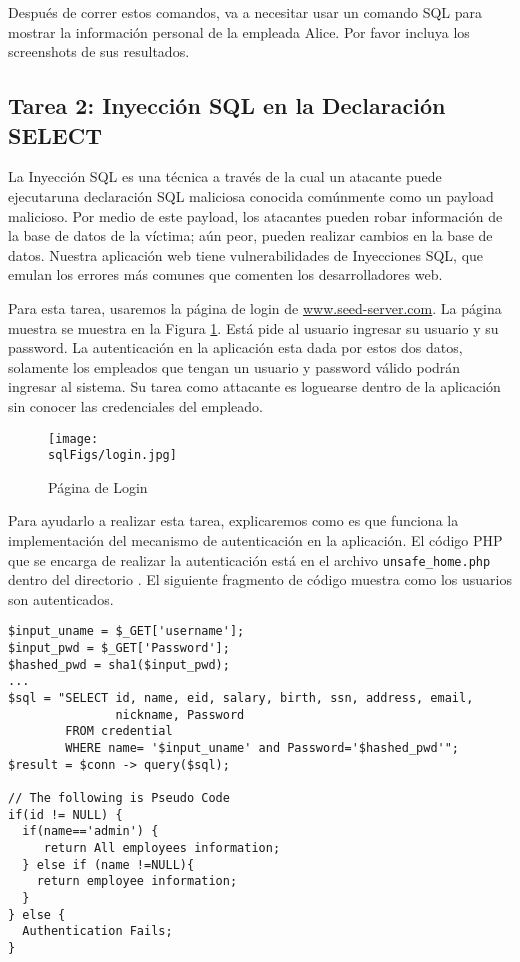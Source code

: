 Después de correr estos comandos, va a necesitar usar un comando SQL para mostrar la información personal de la empleada Alice. Por favor incluya los screenshots de sus resultados.

\subsection{Tarea 2: Inyección SQL en la Declaración SELECT} 

La Inyección SQL es una técnica a través de la cual un atacante puede ejecutaruna  declaración SQL maliciosa conocida comúnmente como un payload malicioso. Por medio de este payload, los atacantes pueden robar información de la base de datos de la víctima; aún peor, pueden realizar cambios en la base de datos. Nuestra aplicación web tiene vulnerabilidades de Inyecciones SQL, que emulan los errores más comunes que comenten los desarrolladores web.

Para esta tarea, usaremos la página de login de \url{www.seed-server.com}.
La página muestra se muestra en la Figura \ref{sql:fig:login}.
Está pide al usuario ingresar su usuario y su password.
La autenticación en la aplicación esta dada por estos dos datos, solamente los empleados que tengan un usuario y password válido podrán ingresar al sistema.
Su tarea como attacante es loguearse dentro de la aplicación sin conocer las credenciales del empleado. 


\begin{figure}[htb]
\begin{center}
\texttt{[image: \\sqlFigs/login.jpg]}
\end{center}
\caption{Página de Login}
\label{sql:fig:login}
\end{figure}
 
Para ayudarlo a realizar esta tarea, explicaremos como es que funciona la implementación del mecanismo de autenticación en la aplicación. El código PHP que se encarga de realizar la autenticación está en el archivo \texttt{unsafe\_home.php} dentro del directorio .
El siguiente fragmento de código muestra como los usuarios son autenticados.

\begin{lstlisting}
$input_uname = $_GET['username'];
$input_pwd = $_GET['Password'];
$hashed_pwd = sha1($input_pwd);
...
$sql = "SELECT id, name, eid, salary, birth, ssn, address, email, 
               nickname, Password
        FROM credential
        WHERE name= '$input_uname' and Password='$hashed_pwd'";
$result = $conn -> query($sql);

// The following is Pseudo Code 
if(id != NULL) {
  if(name=='admin') {
     return All employees information;
  } else if (name !=NULL){
    return employee information;
  }
} else {
  Authentication Fails;
}
\end{lstlisting}

